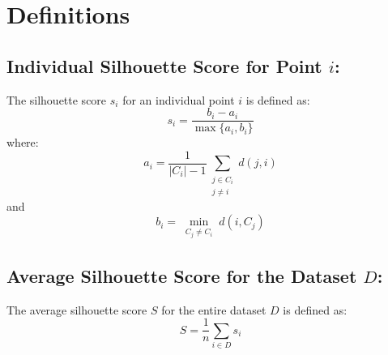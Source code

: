\documentclass{article}
\begin{document}
\section*{Definitions}

\subsection*{Individual Silhouette Score for Point \( i \):}

The silhouette score \( s_i \) for an individual point \( i \) is defined as:
\[
s_i = \frac{b_i - a_i}{\max\{a_i, b_i\}}
\]
where:
\[
a_i = \frac{1}{|C_i| - 1} \sum_{\substack{j \in C_i \\ j \neq i}} d(j, i)
\]
and
\[
b_i = \min_{\substack{C_j \neq C_i}} d(i, C_j)
\]

\subsection*{Average Silhouette Score for the Dataset \( D \):}

The average silhouette score \( S \) for the entire dataset \( D \) is defined as:
\[
S = \frac{1}{n} \sum_{i \in D} s_i
\]
\end{document}
